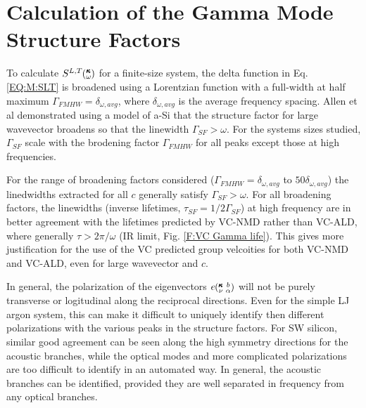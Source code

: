 \documentclass[aps,prb,onecolumn,preprint,superscriptaddress,amsmath,amssymb,floatfix]{revtex4}
\newcommand{\kvba}{\mspace{-4.0mu}\left(\mspace{-8.0mu}
\begin{smallmatrix} &\pmb{\kappa} &b \\ &\nu &\alpha\end{smallmatrix}
\mspace{-3.0mu}\right)}
\newcommand{\kw}{\mspace{-4.0mu}\left(\mspace{-8.0mu}
\begin{smallmatrix}&\pmb{\kappa} \\&\omega\end{smallmatrix}
\mspace{-3.0mu}\right)}
\begin{document}
\section{\label{A:SF}Calculation of the Gamma Mode Structure Factors}

To calculate 
$S^{L,T}\kw$ for a finite-size system, the 
delta function in Eq. \eqref{EQ:M:SLT} is broadened using a Lorentzian 
function with a full-width at half maximum 
$\Gamma_{FMHW} = \delta_{\omega,avg}$, 
where 
$\delta_{\omega,avg}$ is the average frequency spacing. 
Allen et al\cite{allen_diffusons_1999} 
demonstrated using a model of 
a-Si that the structure factor 
for large wavevector broadens so that the 
linewidth $\Gamma_{SF} > \omega$.
\cite{taraskin_determination_1999}
For the systems sizes studied, $\Gamma_{SF}$ 
scale with the brodening factor 
$\Gamma_{FMHW}$ for all peaks 
except those at high frequencies. 

For the range of broadening factors 
considered ($\Gamma_{FMHW} = \delta_{\omega,avg}$ to $50\delta_{\omega,avg}$) 
the linedwidths extracted for all $c$ 
generally satisfy $\Gamma_{SF} > \omega$. 
For all broadening factors, the linewidths 
(inverse lifetimes, $\tau_{SF} = 1/2\Gamma_{SF}$) 
at high frequency are in better 
agreement with the lifetimes predicted 
by VC-NMD rather than VC-ALD,
where generally $\tau > 2\pi/\omega$ 
(IR limit, Fig. \ref{F:VC Gamma life}).
\cite{taraskin_determination_1999} This gives more  
justification for the use of the VC predicted group velcoities for 
both VC-NMD and VC-ALD, even for large wavevector and $c$. 

In general, the polarization of the eigenvectors $e\kvba$ will not 
be purely transverse or logitudinal along the reciprocal directions. 
Even for the simple LJ argon system, this can make it difficult to 
uniquely identify then different polarizations with the various 
peaks in the structure factors. For SW silicon, similar good agreement 
can be seen along the high symmetry directions for the acoustic branches, 
while the optical modes 
and more complicated polarizations are too difficult to identify in 
an automated way. 
In general, the acoustic branches can be identified, provided they are 
well separated in frequency from any optical branches.
\cite{feldman_numerical_1999,thomas_predicting_2010} 

\end{document}
